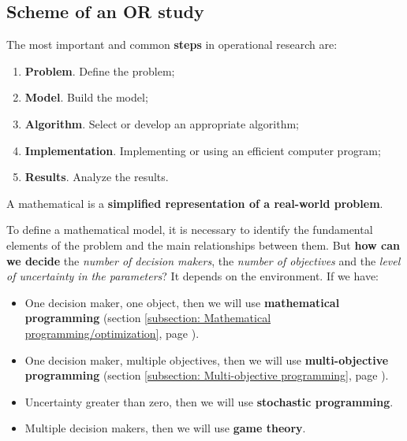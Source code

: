 \subsection{Scheme of an OR study}

The most important and common \textbf{steps} in operational research are:
\begin{enumerate}
    \item \textbf{Problem}. Define the problem;
    \item \textbf{Model}. Build the model;
    \item \textbf{Algorithm}. Select or develop an appropriate algorithm;
    \item \textbf{Implementation}. Implementing or using an efficient computer program;
    \item \textbf{Results}. Analyze the results.
\end{enumerate}

\begin{definitionbox}
    A mathematical  is a \textbf{simplified representation of a real-world problem}.
\end{definitionbox}

\noindent
To define a mathematical model, it is necessary to identify the fundamental elements of the problem and the main relationships between them. But \textbf{how can we decide} the \emph{number of decision makers}, the \emph{number of objectives} and the \emph{level of uncertainty in the parameters}? It depends on the environment. If we have:
\begin{itemize}
    \item One decision maker, one object, then we will use \textbf{mathematical programming} (section \ref{subsection: Mathematical programming/optimization}, page \pageref{subsection: Mathematical programming/optimization}).
    \item One decision maker, multiple objectives, then we will use \textbf{multi-objective programming} (section \ref{subsection: Multi-objective programming}, page \pageref{subsection: Multi-objective programming}).
    \item Uncertainty greater than zero, then we will use \textbf{stochastic programming}.
    \item Multiple decision makers, then we will use \textbf{game theory}.
\end{itemize}

